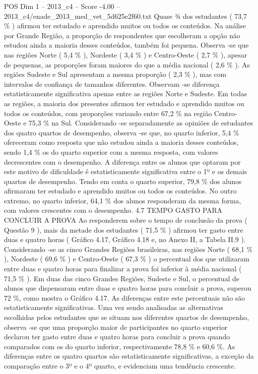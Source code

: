 \begin{textsample}{POS Dim 1 – 2013\_c4 – Score -4.00 – 2013\_c4/enade\_2013\_med\_vet\_5d625e2f60.txt}
Quase ¾ dos estudantes ( 73,7 \% ) afirmou ter estudado e aprendido muitos ou todos os conteúdos.
Na análise por Grande Região, a proporção de respondentes que escolheram a opção não estudou ainda a maioria desses conteúdos, também foi pequena.
Observa -se que nas regiões Norte ( 5,4 \% ), Nordeste ( 3,4 \% ) e Centro-Oeste ( 2,7 \% ), apesar de pequenas, as proporções foram maiores do que a média nacional ( 2,6 \% ).
As regiões Sudeste e Sul apresentam a mesma proporção ( 2,3 \% ), mas com intervalos de confiança de tamanhos diferentes.
Observam -se diferença estatisticamente significativa apenas entre as regiões Norte e Sudeste.
Em todas as regiões, a maioria dos presentes afirmou ter estudado e aprendido muitos ou todos os conteúdos, com proporções variando entre 67,2 \% na região Centro-Oeste e 75,3 \% na Sul.
Considerando -se separadamente as opiniões de estudantes dos quatro quartos de desempenho, observa -se que, no quarto inferior, 5,4 \% ofereceram como resposta que não estudou ainda a maioria desses conteúdos, sendo 1,4 \% os do quarto superior com a mesma resposta, com valores decrescentes com o desempenho.
A diferença entre os alunos que optaram por este motivo de dificuldade é estatisticamente significativa entre o 1º e os demais quartos de desempenho.
Tendo em conta o quarto superior, 79,8 \% dos alunos afirmaram ter estudado e aprendido muitos ou todos os conteúdos.
No outro extremo, no quarto inferior, 64,1 \% dos alunos responderam da mesma forma, com valores crescentes com o desempenho. 4.7 TEMPO GASTO PARA CONCLUIR A PROVA Ao responderem sobre o tempo de conclusão da prova ( Questão 9 ), mais da metade dos estudantes ( 71,5 \% ) afirmou ter gasto entre duas e quatro horas ( Gráfico 4.17, Gráfico 4.18 e, no Anexo II, a Tabela II.9 ).
Considerando -se as cinco Grandes Regiões brasileiras, nas regiões Norte ( 68,1 \% ), Nordeste ( 69,6 \% ) e Centro-Oeste ( 67,3 \% ) o percentual dos que utilizaram entre duas e quatro horas para finalizar a prova foi inferior à média nacional ( 71,5 \% ).
Em duas das cinco Grandes Regiões, Sudeste e Sul, o percentual de alunos que dispensaram entre duas e quatro horas para concluir a prova, superou 72 \%, como mostra o Gráfico 4.17.
As diferenças entre este percentuais não são estatisticamente significativas.
Uma vez sendo analisadas as alternativas escolhidas pelos estudantes que se situam nos diferentes quartos de desempenho, observa -se que uma proporção maior de participantes no quarto superior declarou ter gasto entre duas e quatro horas para concluir a prova quando comparados com os do quarto inferior, respectivamente 78,8 \% e 60,6 \%.
As diferenças entre os quatro quartos são estatisticamente significativas, a exceção da comparação entre o 3º e o 4º quarto, e evidenciam uma tendência crescente.

\end{textsample}
